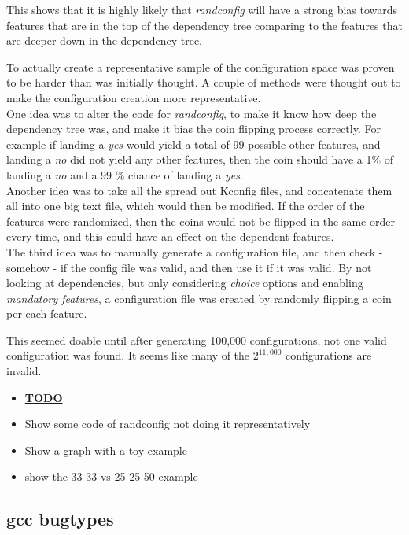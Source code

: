 \documentclass[a4paper,11pt]{article}
\begin{document}
This shows that it is highly likely that \emph{randconfig} will have a strong 
bias towards features that are in the top of the dependency tree comparing to 
the features that are deeper down in the dependency tree. 

To actually create a representative sample of the configuration space was 
proven to be harder than was initially thought. A couple of methods were 
thought out to make the configuration creation more representative. \\


One idea was to alter the code for \emph{randconfig}, to make it know how deep 
the dependency tree was, and make it bias the coin flipping process correctly. 
For example if landing a \emph{yes} would yield a total of 99 possible other 
features, and landing a \emph{no} did not yield any other features, then the 
coin should have a 1\% of landing a \emph{no} and a 99 \% chance of landing a 
\emph{yes}. \\


Another idea was to take all the spread out Kconfig files, and concatenate 
them all into one big text file, which would then be modified. If the order of 
the features were randomized, then the coins would not be flipped in the same 
order every time, and this could have an effect on the dependent features. \\

The third idea was to manually generate a configuration file, and then check - 
somehow - if the config file was valid, and then use it if it was valid. By 
not looking at dependencies, but only considering \emph{choice} options and 
enabling \emph{mandatory features}, a configuration file was created by 
randomly flipping a coin per each feature.

This seemed doable until after generating 100,000 configurations, not one 
valid configuration was found. It seems like many of the $2^{11,000}$ 
configurations are invalid.


\begin{itemize}
    \item \underline{\textbf{TODO}}
    \item Show some code of randconfig not doing it representatively
    \item Show a graph with a toy example
    \item show the 33-33 vs 25-25-50 example
\end{itemize}


\subsection{gcc bugtypes}
\end{document}

